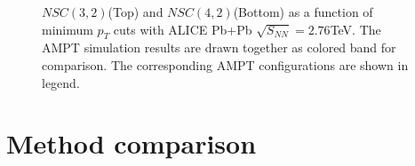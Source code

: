 	\begin{figure}[p]
		\begin{center}
           \caption{$NSC(3,2)$(Top) and $NSC(4,2)$(Bottom) as a function of minimum $p_T$ cuts with ALICE Pb+Pb $\sqrt{S_{NN}}=2.76$TeV. The AMPT simulation results are drawn together as colored band for comparison. The corresponding AMPT configurations are shown in legend.}
        \label{fig:SC_xpt}
        \end{center}   
     \end{figure}
\clearpage



\section{Method comparison}


